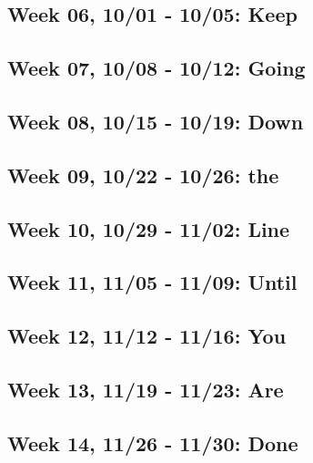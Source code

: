 \documentclass[11pt,]{article}
\begin{document}
\hypertarget{week-06-1001---1005-keep}{%
\subsection{Week 06, 10/01 - 10/05:
Keep}\label{week-06-1001---1005-keep}}

\hypertarget{week-07-1008---1012-going}{%
\subsection{Week 07, 10/08 - 10/12:
Going}\label{week-07-1008---1012-going}}

\hypertarget{week-08-1015---1019-down}{%
\subsection{Week 08, 10/15 - 10/19:
Down}\label{week-08-1015---1019-down}}

\hypertarget{week-09-1022---1026-the}{%
\subsection{Week 09, 10/22 - 10/26: the}\label{week-09-1022---1026-the}}

\hypertarget{week-10-1029---1102-line}{%
\subsection{Week 10, 10/29 - 11/02:
Line}\label{week-10-1029---1102-line}}

\hypertarget{week-11-1105---1109-until}{%
\subsection{Week 11, 11/05 - 11/09:
Until}\label{week-11-1105---1109-until}}

\hypertarget{week-12-1112---1116-you}{%
\subsection{Week 12, 11/12 - 11/16: You}\label{week-12-1112---1116-you}}

\hypertarget{week-13-1119---1123-are}{%
\subsection{Week 13, 11/19 - 11/23: Are}\label{week-13-1119---1123-are}}

\hypertarget{week-14-1126---1130-done}{%
\subsection{Week 14, 11/26 - 11/30:
Done}\label{week-14-1126---1130-done}}
\end{document}
